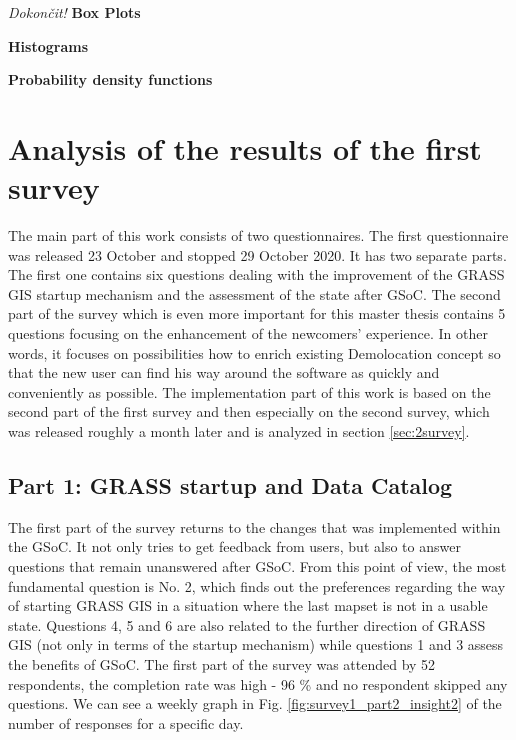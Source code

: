\documentclass[a4paper,10pt,twoside]{article}
\begin{document}
\noindent \textit{\color{red}Dokončit!}
\noindent \textbf {Box Plots}
\smallskip

\noindent \textbf {Histograms}
\smallskip

\noindent \textbf {Probability density functions}
\smallskip



\newpage
\vspace*{-1cm}
\section{Analysis of the results of the first survey}
\label{sec:qstat}

\noindent The main part of this work consists of two questionnaires. The first questionnaire was released 23 October and stopped 29 October 2020. It has two separate parts. The first one contains six questions dealing with the improvement of the GRASS GIS startup mechanism and the assessment of the state after GSoC. The second part of the survey which is even more important for this master thesis contains 5 questions focusing on the enhancement of the newcomers' experience. In other words, it focuses on possibilities how to enrich existing Demolocation concept so that the new user can find his way around the software as quickly and conveniently as possible. The implementation part of this work is based on the second part of the first survey and then especially on the second survey, which was released roughly a month later and is analyzed in section \ref{sec:2survey}.

\subsection{Part 1: GRASS startup and Data Catalog}

\noindent The first part of the survey returns to the changes that was implemented within the GSoC. It not only tries to get feedback from users, but also to answer questions that remain unanswered after GSoC. From this point of view, the most fundamental question is No. 2, which finds out the preferences regarding the way of starting GRASS GIS in a situation where the last mapset is not in a usable state. Questions 4, 5 and 6 are also related to the further direction of GRASS GIS (not only in terms of the startup mechanism) while questions 1 and 3 assess the benefits of GSoC. The first part of the survey was attended by 52 respondents, the completion rate was high - 96 \% and no respondent skipped any questions. We can see a weekly graph in Fig. \ref{fig:survey1_part2_insight2} of the number of responses for a specific day.
\end{document}
